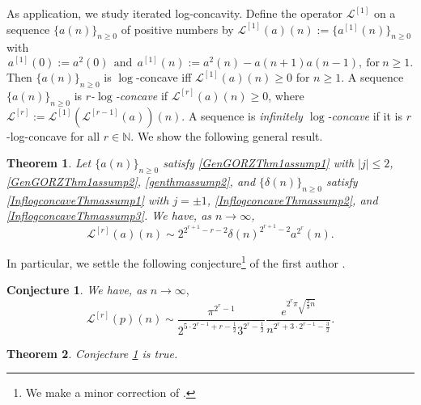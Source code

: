 \documentclass[11pt,reqno,a4paper]{amsart}
\newcommand{\N}{\mathbb{N}}
\renewcommand{\d}{{\delta}}
\renewcommand{\(}{\left\(}
\renewcommand{\)}{\right\)}
\numberwithin{equation}{section}
\theoremstyle{plain}
\newtheorem{theorem}{Theorem}[section]
\theoremstyle{definition} %
\newcounter{specialstatement}
\newtheorem{conjecture}[specialstatement]{Conjecture}
\numberwithin{equation}{section}
\begin{document}
As application, we study iterated log-concavity. Define the operator $\mathcal{L}^{[1]}$ on a sequence $\{a(n)\}_{n \geq 0}$ of positive numbers by $\mathcal{L}^{[1]}(a)(n):=\{a^{[1]}(n)\}_{n\geq 0}$ with
\begin{equation}\label{logdef}
a^{[1]}(0):=a^2(0)\ \ \text{and}\ \ a^{[1]}(n):=a^2(n)-a(n+1)a(n-1),\ \text{for}\ n \geq 1.
\end{equation}
Then $\{a(n)\}_{n\ge 0}$ is $\log$-concave iff $\mathcal{L}^{[1]}(a)(n)\ge 0$ for $n\ge 1$. A sequence $\{a(n)\}_{n\ge 0}$ is {\it $r$-$\log$-concave} if $\mathcal{L}^{[r]}(a)(n)\ge 0$, where $\mathcal{L}^{[r]}:=\mathcal{L}^{[1]}\left(\mathcal{L}^{[r-1]}(a)\right)(n).$
A sequence is {\it infinitely $\log$-concave} if it is $r$-log-concave for all $r \in\N$. We show the following general result.
\begin{theorem}\label{InflogconcaveThm}
 Let $\{a(n)\}_{n\ge 0}$ satisfy {\rm{\ref{GenGORZThm1assump1}}} with $|j|\le 2$, {\rm{\ref{GenGORZThm1assump2}}}, {\rm{\ref{genthmassump2}}}, and $\{\d(n)\}_{n\ge 0}$ satisfy {\rm{\ref{InflogconcaveThmassump1}}} with $j=\pm 1$, {\rm{\ref{InflogconcaveThmassump2}}}, and {\rm{\ref{InflogconcaveThmassump3}}}. We have, as $n\to \infty$, 
	\[
	\mathcal{L}^{[r]}(a)(n) \sim 2^{2^{r+1}-r-2}\d(n)^{2^{r+1}-2} a^{2^r}\!(n).
	\]
\end{theorem}
In particular, we settle the following conjecture\footnote{ We make a minor correction of \cite[Conjecture 7.19]{Ban}.} of the first author \cite[Conjecture 7.19]{Ban}. %
\begin{conjecture}\label{Banconj1}
{\it We have, as} $n\to \infty$, 
\[
\mathcal{L}^{[r]}(p)(n)\sim \frac{ \pi^{2^r-1}}{2^{5\cdot 2^{r-1}+r-\frac 12} 3^{2^r-\frac 12}}\frac{ e^{2^r\pi\sqrt{\frac{2}3 n}}}{n^{2^r+3\cdot 2^{r-1}-\frac 32}}. 
\]	
\end{conjecture}




\begin{theorem}\label{inflogthm1} 
Conjecture \ref{Banconj1} is true.
\end{theorem}
\end{document}

